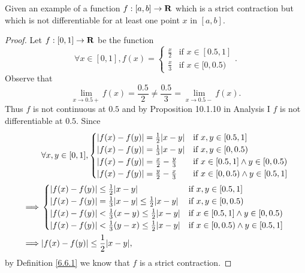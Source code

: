 \begin{exercise}\label{ex 6.6.4}
    Given an example of a function \(f : [a, b] \to \mathbf{R}\) which is a strict contraction but which is not differentiable for at least one point \(x\) in \([a, b]\).
\end{exercise}

\begin{proof}
    Let \(f : [0, 1] \to \mathbf{R}\) be the function
    \[
        \forall x \in [0, 1], f(x) = \begin{cases}
            \frac{x}{2} & \text{if } x \in [0.5, 1] \\
            \frac{x}{3} & \text{if } x \in [0, 0.5)
        \end{cases}.
    \]
    Observe that
    \[
        \lim_{x \to 0.5+} f(x) = \frac{0.5}{2} \neq \frac{0.5}{3} = \lim_{x \to 0.5-} f(x).
    \]
    Thus \(f\) is not continuous at \(0.5\) and by Proposition 10.1.10 in Analysis I \(f\) is not differentiable at \(0.5\).
    Since
    \begin{align*}
                 & \forall x, y \in [0, 1], \begin{cases}
                                                \abs{f(x) - f(y)} = \frac{1}{2} \abs{x - y}   & \text{if } x, y \in [0.5, 1]                   \\
                                                \abs{f(x) - f(y)} = \frac{1}{3} \abs{x - y}   & \text{if } x, y \in [0, 0.5)                   \\
                                                \abs{f(x) - f(y)} = \frac{x}{2} - \frac{y}{3} & \text{if } x \in [0.5, 1] \land y \in [0, 0.5) \\
                                                \abs{f(x) - f(y)} = \frac{y}{2} - \frac{x}{3} & \text{if } x \in [0, 0.5) \land y \in [0.5, 1]
                                            \end{cases}   \\
        \implies & \begin{cases}
                       \abs{f(x) - f(y)} \leq \frac{1}{2} \abs{x - y}                           & \text{if } x, y \in [0.5, 1]                   \\
                       \abs{f(x) - f(y)} = \frac{1}{3} \abs{x - y} \leq \frac{1}{2} \abs{x - y} & \text{if } x, y \in [0, 0.5)                   \\
                       \abs{f(x) - f(y)} < \frac{1}{3} (x - y) \leq \frac{1}{2} \abs{x - y}     & \text{if } x \in [0.5, 1] \land y \in [0, 0.5) \\
                       \abs{f(x) - f(y)} < \frac{1}{3} (y - x) \leq \frac{1}{2} \abs{x - y}     & \text{if } x \in [0, 0.5) \land y \in [0.5, 1]
                   \end{cases} \\
        \implies & \abs{f(x) - f(y)} \leq \frac{1}{2} \abs{x - y},
    \end{align*}
    by Definition \ref{6.6.1} we know that \(f\) is a strict contraction.
\end{proof}

